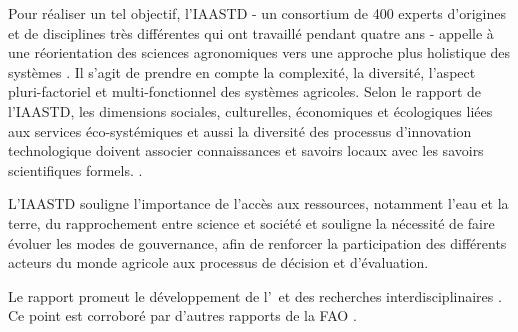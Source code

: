 Pour réaliser un tel objectif, l'IAASTD - un consortium de 400 experts d'origines et de disciplines très différentes qui ont travaillé pendant quatre ans - appelle à une réorientation des sciences agronomiques vers une approche plus holistique des systèmes \cite{iaastd_agriculture_2008,even_liaastd_2009}.
Il s'agit de prendre en compte la complexité, la diversité, l'aspect pluri-factoriel et multi-fonctionnel des systèmes agricoles.
Selon le rapport de l'IAASTD, les dimensions sociales, culturelles, économiques et écologiques liées aux services éco-systémiques et aussi la diversité des processus d’innovation technologique doivent associer connaissances et savoirs locaux avec les savoirs scientifiques formels. \cite{iaastd_agriculture_2008,fao_report_2010,mea_ecosystems_2005}.

L'IAASTD souligne l'importance de l'accès aux ressources, notamment l'eau et la terre, du rapprochement entre science et société et souligne la nécessité de faire évoluer les modes de gouvernance, afin de renforcer la participation des différents acteurs du monde agricole aux processus de décision et d’évaluation.

Le rapport promeut le développement de l'\agec~et des recherches interdisciplinaires \cite{even_liaastd_2009}.
Ce point est corroboré par d'autres rapports de la FAO \cite{fao_international_2007,fao_biodiversity_2010}.

